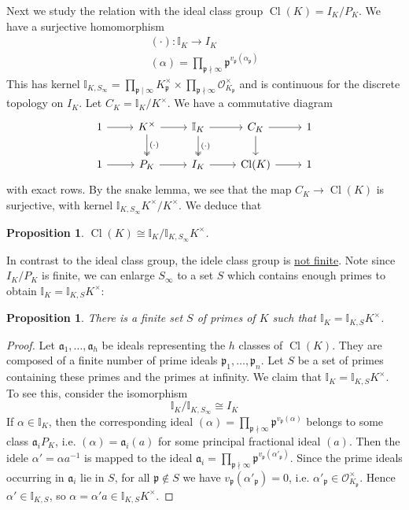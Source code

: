 \documentclass[11pt]{article}
\theoremstyle{definition}
\theoremstyle{plain}
\newtheorem{proposition}[definition]{Proposition}
\theoremstyle{remark}
\DeclareMathOperator{\Cl}{Cl}
\newcommand{\II}{\mathbb{I}}
\newcommand{\cO}{\mathcal{O}}
\newcommand{\fa}{\mathfrak{a}}
\newcommand{\fp}{\mathfrak{p}}
\begin{document}
Next we study the relation with the ideal class group $\Cl(K) = I_K / P_K$. We have a surjective homomorphism
\begin{gather*}
    (\cdot) : \II_K \to I_K\\
    (\alpha) = \prod_{\fp \nmid \infty} \fp^{v_\fp(\alpha_\fp)}
\end{gather*}
This has kernel $\II_{K, S_\infty} = \prod_{\fp \mid \infty} K_\fp^\times \times \prod_{\fp \nmid \infty} \cO_{K_\fp}^\times$ and is continuous for the discrete topology on $I_K$. Let $C_K = \II_K / K^\times$. We have a commutative diagram
\begin{equation*}
\begin{tikzcd}
    1 \arrow[r] & K^\times \arrow[r] \arrow[d, twoheadrightarrow, "(\cdot)"] & \II_K \arrow[r] \arrow[d, twoheadrightarrow, "(\cdot)"] & C_K \arrow[r] \arrow[d] & 1 \\
    1 \arrow[r] & P_K \arrow[r] & I_K \arrow[r] & \Cl(K) \arrow[r] & 1
\end{tikzcd}
\end{equation*}
with exact rows. By the snake lemma, we see that the map $C_K \to \Cl(K)$ is surjective, with kernel $\II_{K, S_\infty} K^\times / K^\times$. We deduce that
\begin{proposition}\label{prop:9_9}
    $\Cl(K) \cong \II_K / \II_{K, S_\infty} K^\times$.
\end{proposition}

In contrast to the ideal class group, the idele class group is \underline{not finite}. Note since $I_K / P_K$ is finite, we can enlarge $S_\infty$ to a set $S$ which contains enough primes to obtain $\II_K = \II_{K,S} K^\times$:

\begin{proposition}\label{prop:9_10}
    There is a finite set $S$ of primes of $K$ such that $\II_K = \II_{K,S} K^\times$.
\end{proposition}
\begin{proof}
    Let $\fa_1, \ldots, \fa_h$ be ideals representing the $h$ classes of $\Cl(K)$. They are composed of a finite number of prime ideals $\fp_1, \ldots, \fp_n$. Let $S$ be a set of primes containing these primes and the primes at infinity. We claim that $\II_K = \II_{K,S} K^\times$. To see this, consider the isomorphism
    \begin{equation*}
        \II_K / \II_{K, S_\infty} \cong I_K
    \end{equation*}
    If $\alpha \in \II_K$, then the corresponding ideal $(\alpha) = \prod_{\fp \nmid \infty} \fp^{v_\fp(\alpha)}$ belongs to some class $\fa_i P_K$, i.e. $(\alpha) = \fa_i (a)$ for some principal fractional ideal $(a)$. Then the idele $\alpha' = \alpha a^{-1}$ is mapped to the ideal $\fa_i = \prod_{\fp \nmid \infty} \fp^{v_\fp(\alpha'_\fp)}$. Since the prime ideals occurring in $\fa_i$ lie in $S$, for all $\fp \notin S$ we have $v_\fp(\alpha'_\fp) = 0$, i.e. $\alpha'_{\fp} \in \cO_{K_\fp}^\times$. Hence $\alpha' \in \II_{K,S}$, so $\alpha = \alpha' a \in \II_{K, S} K^\times$.
\end{proof}
\end{document}

